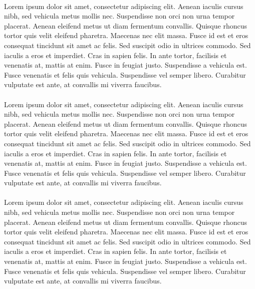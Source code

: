 \documentclass[11pt]{bioinlab}
\begin{document}
\paragraph{}Lorem ipsum dolor sit amet, consectetur adipiscing elit. Aenean iaculis cursus nibh, sed vehicula metus mollis nec. Suspendisse non orci non urna tempor placerat. Aenean eleifend metus ut diam fermentum convallis. Quisque rhoncus tortor quis velit eleifend pharetra. Maecenas nec elit massa. Fusce id est et eros consequat tincidunt sit amet ac felis. Sed suscipit odio in ultrices commodo. Sed iaculis a eros et imperdiet. Cras in sapien felis. In ante tortor, facilisis et venenatis at, mattis at enim. Fusce in feugiat justo. Suspendisse a vehicula est. Fusce venenatis et felis quis vehicula. Suspendisse vel semper libero. Curabitur vulputate est ante, at convallis mi viverra faucibus.
\paragraph{}Lorem ipsum dolor sit amet, consectetur adipiscing elit. Aenean iaculis cursus nibh, sed vehicula metus mollis nec. Suspendisse non orci non urna tempor placerat. Aenean eleifend metus ut diam fermentum convallis. Quisque rhoncus tortor quis velit eleifend pharetra. Maecenas nec elit massa. Fusce id est et eros consequat tincidunt sit amet ac felis. Sed suscipit odio in ultrices commodo. Sed iaculis a eros et imperdiet. Cras in sapien felis. In ante tortor, facilisis et venenatis at, mattis at enim. Fusce in feugiat justo. Suspendisse a vehicula est. Fusce venenatis et felis quis vehicula. Suspendisse vel semper libero. Curabitur vulputate est ante, at convallis mi viverra faucibus.
\paragraph{}Lorem ipsum dolor sit amet, consectetur adipiscing elit. Aenean iaculis cursus nibh, sed vehicula metus mollis nec. Suspendisse non orci non urna tempor placerat. Aenean eleifend metus ut diam fermentum convallis. Quisque rhoncus tortor quis velit eleifend pharetra. Maecenas nec elit massa. Fusce id est et eros consequat tincidunt sit amet ac felis. Sed suscipit odio in ultrices commodo. Sed iaculis a eros et imperdiet. Cras in sapien felis. In ante tortor, facilisis et venenatis at, mattis at enim. Fusce in feugiat justo. Suspendisse a vehicula est. Fusce venenatis et felis quis vehicula. Suspendisse vel semper libero. Curabitur vulputate est ante, at convallis mi viverra faucibus.
\newpage
\end{document}

